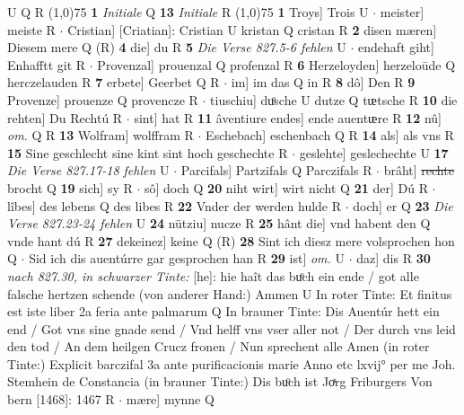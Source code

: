 \documentclass[8pt,a4paper,notitlepage]{article}
\begin{document}
\begin{table}[ht]
\begin{minipage}[t]{0.5\linewidth}
U Q R \newline
\line(1,0){75} \newline
\textbf{1} \textit{Initiale} Q  \textbf{13} \textit{Initiale} R  \newline
\line(1,0){75} \newline
\textbf{1} Troys] Trois U  $\cdot$ meister] meiste R  $\cdot$ Cristian] [Criatian]: Cristian U kristan Q cristan R \textbf{2} disen mæren] Diesem mere Q (R) \textbf{4} die] du R \textbf{5} \textit{Die Verse 827.5-6 fehlen} U   $\cdot$ endehaft giht] Enhafftt git R  $\cdot$ Provenzal] prouenzal Q profenzal R \textbf{6} Herzeloyden] herzeloūde Q herczelauden R \textbf{7} erbete] Geerbet Q R  $\cdot$ im] im das Q in R \textbf{8} dô] Den R \textbf{9} Provenze] prouenze Q provencze R  $\cdot$ tiuschiu] duͦsche U dutze Q tᵫtsche R \textbf{10} die rehten] Du Rechtú R  $\cdot$ sint] hat R \textbf{11} âventiure endes] ende auentᵫre R \textbf{12} nû] \textit{om.} Q R \textbf{13} Wolfram] wolffram R  $\cdot$ Eschebach] eschenbach Q R \textbf{14} als] als vns R \textbf{15} Sine geschlecht sine kint sint hoch geschechte R  $\cdot$ geslehte] geslechechte U \textbf{17} \textit{Die Verse 827.17-18 fehlen} U   $\cdot$ Parcifals] Partzifals Q Parczifals R  $\cdot$ brâht] \sout{rechte} brocht Q \textbf{19} sich] sy R  $\cdot$ sô] doch Q \textbf{20} niht wirt] wirt nicht Q \textbf{21} der] Dú R  $\cdot$ lîbes] des lebens Q des libes R \textbf{22} Vnder der werden hulde R  $\cdot$ doch] er Q \textbf{23} \textit{Die Verse 827.23-24 fehlen} U  \textbf{24} nütziu] nucze R \textbf{25} hânt die] vnd habent den Q vnde hant dú R \textbf{27} dekeinez] keine Q (R) \textbf{28} Sint ich diesz mere volsprochen hon Q  $\cdot$ Sid ich dis auentúrre gar gesprochen han R \textbf{29} ist] \textit{om.} U  $\cdot$ daz] dis R \textbf{30} \textit{nach 827.30, in schwarzer Tinte:} [he]: hie haît das buͦch ein ende / got alle falsche hertzen schende (von anderer Hand:) Ammen U  In roter Tinte: Et finitus est iste liber 2a feria ante palmarum Q  In brauner Tinte: Dis Auentúr hett ein end / Got vns sine gnade send / Vnd helff vns vser aller not / Der durch vns leid den tod / An dem heilgen Crucz fronen / Nun sprechent alle Amen (in roter Tinte:) Explicit barczifal 3a ante purificacionis marie Anno etc lxvij° per me Joh. Stemhein de Constancia (in brauner Tinte:) Dis buͦch ist Joͯrg Friburgers Von bern [1468]: 1467 R   $\cdot$ mære] mynne Q \newline
\end{minipage}
\end{table}
\end{document}

